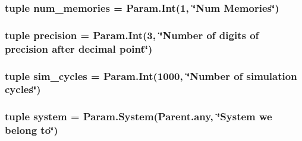\label{classNetworkTest_1_1NetworkTest_a1cf2f09c6d685e8208dc29b8d059c7ae}
\hypertarget{classNetworkTest_1_1NetworkTest_ab844715b7a1585b16c9c91cb4dfda459}{
\subsubsection[{num\_\-memories}]{\setlength{\rightskip}{0pt plus 5cm}tuple {\bf num\_\-memories} = Param.Int(1, \char`\"{}Num Memories\char`\"{})}}
\label{classNetworkTest_1_1NetworkTest_ab844715b7a1585b16c9c91cb4dfda459}
\hypertarget{classNetworkTest_1_1NetworkTest_a38799bf0eeacd907d8a3bd9f5c0af858}{
\subsubsection[{precision}]{\setlength{\rightskip}{0pt plus 5cm}tuple {\bf precision} = Param.Int(3, \char`\"{}Number of digits of {\bf precision} after decimal point\char`\"{})}}
\label{classNetworkTest_1_1NetworkTest_a38799bf0eeacd907d8a3bd9f5c0af858}
\hypertarget{classNetworkTest_1_1NetworkTest_a78445cebdcbe44397ffa62b323c2da98}{
\subsubsection[{sim\_\-cycles}]{\setlength{\rightskip}{0pt plus 5cm}tuple {\bf sim\_\-cycles} = Param.Int(1000, \char`\"{}Number of simulation cycles\char`\"{})}}
\label{classNetworkTest_1_1NetworkTest_a78445cebdcbe44397ffa62b323c2da98}
\hypertarget{classNetworkTest_1_1NetworkTest_ab737471139f5a296e5b26e8a0e1b0744}{
\subsubsection[{system}]{\setlength{\rightskip}{0pt plus 5cm}tuple {\bf system} = Param.System(Parent.any, \char`\"{}System we belong to\char`\"{})}}
